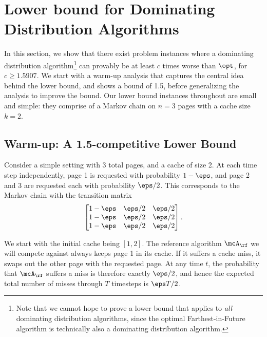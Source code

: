 \section{Lower bound for Dominating Distribution Algorithms}
\label{sec:lb}

In this section, we show that there exist problem instances where a dominating distribution algorithm\footnote{Note that we cannot hope to prove a lower bound that applies to \textit{all} dominating distribution algorithms, since the optimal Farthest-in-Future algorithm is technically also a dominating distribution algorithm.} can provably be at least $c$ times worse than $\opt$, for $c \ge 1.5907$. We start with a warm-up analysis that captures the central idea behind the lower bound, and shows a bound of 1.5, before generalizing the analysis to improve the bound. Our lower bound instances throughout are small and simple: they comprise of a Markov chain on $n=3$ pages with a cache size $k=2$.

\subsection{Warm-up: A 1.5-competitive Lower Bound}
\label{sec:1.5-lb}

Consider a simple setting with 3 total pages, and a cache of size 2. At each time step independently, page 1 is requested with probability $1-\eps$, and page 2 and 3 are requested each with probability $\eps/2$. This corresponds to the Markov chain with the transition matrix
\begin{align*}
    \begin{bmatrix}
        1-\eps & \eps/2 & \eps/2 \\
        1-\eps & \eps/2 & \eps/2 \\
        1-\eps & \eps/2 & \eps/2
    \end{bmatrix}.
\end{align*}

We start with the initial cache being $[1,2]$. The reference algorithm $\mcA_{\rf}$ we will compete against always keeps page 1 in its cache. If it suffers a cache miss, it swaps out the other page with the requested page. At any time $t$, the probability that $\mcA_{\rf}$ suffers a miss is therefore exactly $\eps/2$, and hence the expected total number of misses through $T$ timesteps is $\eps T/2$.

